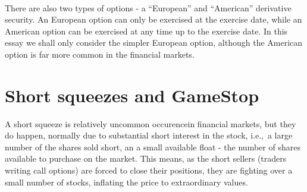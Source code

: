 \documentclass[11pt]{article} %
\begin{document}
\paragraph{}\label{typesofoption}
There are also two types of options - a ``European'' and ``American'' 
derivative security. An European option can only be exercised at the 
exercise date, while an American option can be exercised at any time up 
to the exercise date. In this essay we shall only consider the simpler 
European option, although the American option is far more common in 
the financial markets. 

\section{Short squeezes and GameStop}
A short squeeze is relatively uncommon occurencein financial markets, but they do 
happen, normally due to substantial short interest in the stock, i.e.,\  a large number 
of the shares sold short, an a small available float - the number of shares 
available to purchase on the market. This means, as the short sellers (traders 
writing call options) are forced to close their positions, they are fighting over 
a small number of stocks, inflating the price to extraordinary values. 
\end{document}
